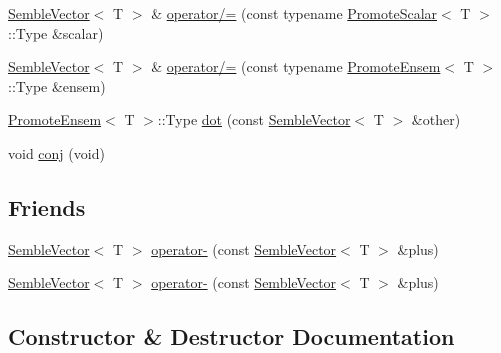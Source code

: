 \begin{DoxyCompactItemize}
\item 
\mbox{\hyperlink{structSEMBLE_1_1SembleVector}{Semble\+Vector}}$<$ T $>$ \& \mbox{\hyperlink{structSEMBLE_1_1SembleVector_a00a31502846c4ed836390808446882e8}{operator/=}} (const typename \mbox{\hyperlink{structSEMBLE_1_1PromoteScalar}{Promote\+Scalar}}$<$ T $>$\+::Type \&scalar)
\item 
\mbox{\hyperlink{structSEMBLE_1_1SembleVector}{Semble\+Vector}}$<$ T $>$ \& \mbox{\hyperlink{structSEMBLE_1_1SembleVector_af78836c9cd297a39e8f7f48bd02858a1}{operator/=}} (const typename \mbox{\hyperlink{structSEMBLE_1_1PromoteEnsem}{Promote\+Ensem}}$<$ T $>$\+::Type \&ensem)
\item 
\mbox{\hyperlink{structSEMBLE_1_1PromoteEnsem}{Promote\+Ensem}}$<$ T $>$\+::Type \mbox{\hyperlink{structSEMBLE_1_1SembleVector_aae6152e55a7c8ed24890ffee09b7b075}{dot}} (const \mbox{\hyperlink{structSEMBLE_1_1SembleVector}{Semble\+Vector}}$<$ T $>$ \&other)
\item 
void \mbox{\hyperlink{structSEMBLE_1_1SembleVector_a82e42a0a34e836f565f54273df6e5e59}{conj}} (void)
\end{DoxyCompactItemize}
\subsection*{Friends}
\begin{DoxyCompactItemize}
\item 
\mbox{\hyperlink{structSEMBLE_1_1SembleVector}{Semble\+Vector}}$<$ T $>$ \mbox{\hyperlink{structSEMBLE_1_1SembleVector_a204fd16972939dadf04093410ae09bef}{operator-\/}} (const \mbox{\hyperlink{structSEMBLE_1_1SembleVector}{Semble\+Vector}}$<$ T $>$ \&plus)
\item 
\mbox{\hyperlink{structSEMBLE_1_1SembleVector}{Semble\+Vector}}$<$ T $>$ \mbox{\hyperlink{structSEMBLE_1_1SembleVector_a204fd16972939dadf04093410ae09bef}{operator-\/}} (const \mbox{\hyperlink{structSEMBLE_1_1SembleVector}{Semble\+Vector}}$<$ T $>$ \&plus)
\end{DoxyCompactItemize}


\subsection{Constructor \& Destructor Documentation}
\mbox{\label{structSEMBLE_1_1SembleVector_a71d201a7d5b2a62cea4034074fa210f5}} 
